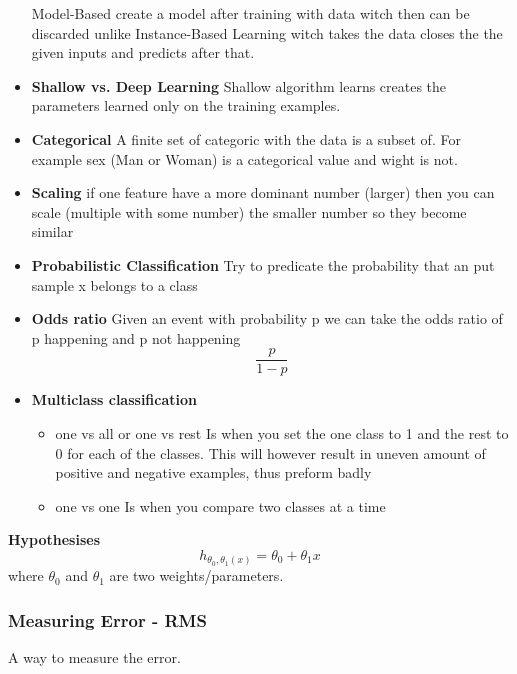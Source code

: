 \begin{multicols}{2}
\begin{itemize}
    Model-Based create a model after training with data witch then can be discarded unlike 
    Instance-Based Learning witch takes the data closes the the given inputs and predicts after that. 
    \item \textbf{Shallow vs. Deep Learning}
    Shallow algorithm learns creates the parameters learned only on the training examples.
    \item \textbf{Categorical} \newline
    A finite set of categoric with the data is a subset of. For example sex (Man or Woman) is a categorical value and wight is not.
    \item \textbf{Scaling} \newline
    if one feature have a more dominant number (larger) then you can scale (multiple with some number) the smaller number so they become similar
    \item \textbf{Probabilistic Classification} \newline 
    Try to predicate the probability that an put sample x belongs to a class
    \item \textbf{Odds ratio} \newline 
    Given an event with probability p we can take the odds ratio of p happening and p not happening
    \begin{equation*}
        \frac{p}{1-p}
    \end{equation*}
    \item \textbf{Multiclass classification}
    \begin{itemize}
        \item one vs all or one vs rest \newline
        Is when you set the one class to 1 and the rest to 0 for each of the classes. This will however result in uneven amount of positive and negative examples, thus preform badly
        \item one vs one \newline 
        Is when you compare two classes at a time
    \end{itemize}
\end{itemize}

\textbf{Hypothesises}
\begin{equation*}
    h_{\theta_0,\theta_1(x)} = \theta_0 + \theta_1 x
\end{equation*}
where $\theta_0$ and $\theta_1$ are two weights/parameters.

\subsubsection{Measuring Error - RMS}
A way to measure the error.


\end{multicols}
